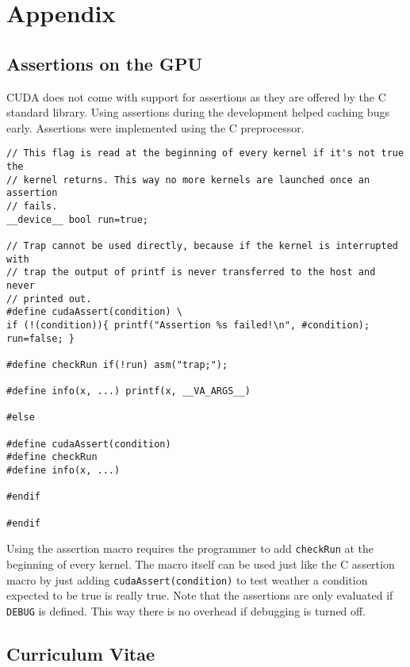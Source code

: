 \section{Appendix}

\subsection{Assertions on the GPU}

CUDA does not come with support for assertions as they are offered by the C standard library. Using assertions during the development helped caching bugs early. Assertions were implemented using the C preprocessor.

\begin{lstlisting}
// This flag is read at the beginning of every kernel if it's not true the
// kernel returns. This way no more kernels are launched once an assertion
// fails.
__device__ bool run=true;

// Trap cannot be used directly, because if the kernel is interrupted with
// trap the output of printf is never transferred to the host and never
// printed out.
#define cudaAssert(condition) \
if (!(condition)){ printf("Assertion %s failed!\n", #condition); run=false; }

#define checkRun if(!run) asm("trap;");

#define info(x, ...) printf(x, __VA_ARGS__)

#else

#define cudaAssert(condition)
#define checkRun
#define info(x, ...)

#endif

#endif
\end{lstlisting}

Using the assertion macro requires the programmer to add \verb+checkRun+ at the beginning of every kernel. The macro itself can be used just like the C assertion macro by just adding \verb+cudaAssert(condition)+ to test weather a condition expected to be true is really true. Note that the assertions are only evaluated if \verb+DEBUG+ is defined. This way there is no overhead if debugging is turned off.

\subsection{Curriculum Vitae}


